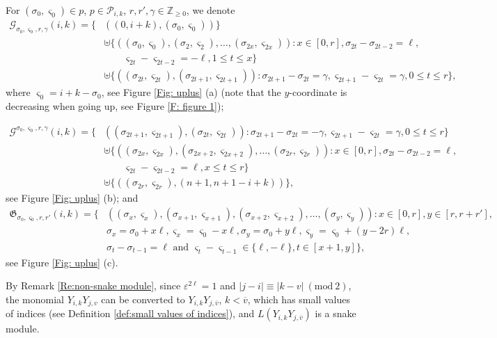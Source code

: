 \documentclass[12pt, reqno]{amsart}
\numberwithin{equation}{section}
\begin{document}
{For $(\sigma_0, \varsigma_0)\in p$, $p\in \mathscr{P}_{i,k}$, $r, r', \gamma \in \mathbb{Z}_{\geq 0}$, we denote
\begin{align*}
\mathscr{G}_{\sigma_0, \varsigma_0, r, \gamma}(i,k)=\{ & ((0,i+k), (\sigma_0,\varsigma_{0}))\}\\
&\uplus \{((\sigma_0,\varsigma_0),(\sigma_2,\varsigma_2), \ldots, (\sigma_{2x},\varsigma_{2x}) ): x\in [0,r], \sigma_{2t}-\sigma_{2t-2}= \ell,\\
&\quad \quad \varsigma_{2t}-\varsigma_{2t-2}=- \ell, 1\leq t\leq x \}\\
&\uplus \{((\sigma_{2t},\varsigma_{2t}),(\sigma_{2t+1},\varsigma_{2t+1})):
\sigma_{2t+1}-\sigma_{2t}= \gamma, \varsigma_{2t+1}-\varsigma_{2t}=\gamma, 0\leq t\leq r\},
\end{align*}
where $\varsigma_{0}=i+k-\sigma_0$, see Figure \ref{Fig: uplus} (a) (note that the $y$-coordinate is decreasing when going up, see Figure \ref{F: figure 1});

\begin{align*}
\mathscr{G}^{\sigma_0, \varsigma_0, r,\gamma}(i,k)=\{ & ((\sigma_{2t+1},\varsigma_{2t+1}),(\sigma_{2t},\varsigma_{2t})): \sigma_{2t+1}-\sigma_{2t}= -\gamma, \varsigma_{2t+1}-\varsigma_{2t}=\gamma, 0\leq t\leq r\} \\
&\uplus\{((\sigma_{2x},\varsigma_{2x}), (\sigma_{2x+2},\varsigma_{2x+2}), \ldots, (\sigma_{2r},\varsigma_{2r})):  x\in [0,r], \sigma_{2t}-\sigma_{2t-2}= \ell, \\
&\quad\quad \varsigma_{2t}-\varsigma_{2t-2}= \ell, x\leq t\leq r\} \\
&\uplus\{((\sigma_{2r},\varsigma_{2r}), (n+1,n+1-i+k))\},
\end{align*}
see Figure \ref{Fig: uplus} (b); and
\begin{align*}
\mathfrak{G}_{\sigma_0, \varsigma_0, r, r'}(i,k)=\{ & ((\sigma_x,\varsigma_{x}), (\sigma_{x+1}, \varsigma_{x+1}), (\sigma_{x+ 2}, \varsigma_{x+2}), \ldots, (\sigma_y,\varsigma_{y})): x\in[0,r], y\in[r,r+r'], \\
&\sigma_x= \sigma_0+x \ell, \varsigma_{x}=\varsigma_0-x \ell,\sigma_y= \sigma_0+y \ell, \varsigma_{y}=\varsigma_0+(y-2r) \ell, \\
& \sigma_t-\sigma_{t-1}=\ell \text{ and } \varsigma_t-\varsigma_{t-1} \in \{ \ell, -\ell\}, t \in [x+1, y] \},
\end{align*}
see Figure \ref{Fig: uplus} (c).


By Remark \ref{Re:non-snake module}, since $\varepsilon^{2\ell}=1$ and $|j-i|\equiv |k-v|\ (\text{mod}\ 2)$, the monomial $Y_{i,k}Y_{j,v}$ can be converted to $Y_{i,k}Y_{j,\overline{v}}$, $k <\overline{v}$, which has small values of indices (see Definition \ref{def:small values of indices}), and $L(Y_{i, k}Y_{j, \overline{v}})$ is a snake module.

}
\end{document}
